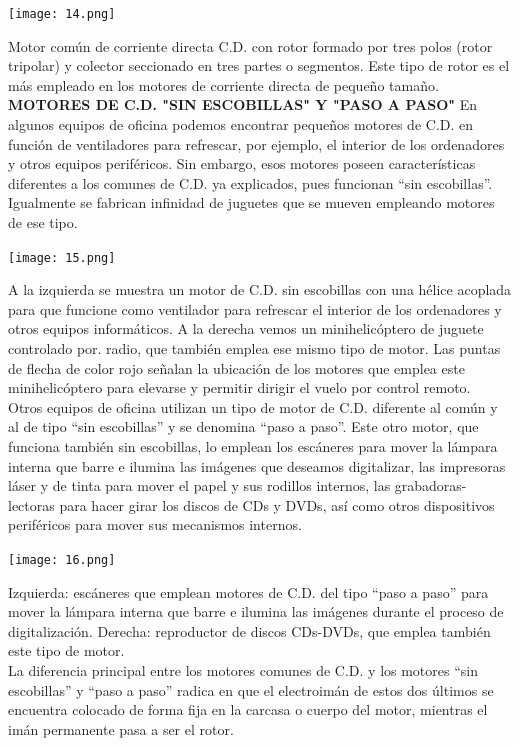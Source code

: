 \documentclass[10pt,a4paper]{article}
\begin{document}
\begin{center}
\texttt{[image: 14.png]} 
\end{center}
Motor común de corriente directa C.D. con rotor formado por tres polos (rotor tripolar) y colector seccionado en tres partes o segmentos. Este tipo de rotor es el más empleado en los motores de corriente directa de pequeño tamaño.\\
\textbf{MOTORES DE C.D. "SIN ESCOBILLAS" Y "PASO A PASO"}
En algunos equipos de oficina podemos encontrar pequeños motores de C.D. en función de ventiladores para refrescar, por ejemplo, el interior de los ordenadores y otros equipos periféricos. Sin embargo, esos motores poseen características diferentes a los comunes de C.D. ya explicados, pues funcionan “sin escobillas”. Igualmente se fabrican infinidad de juguetes que se mueven empleando motores de ese tipo.\\

\begin{center}
\texttt{[image: 15.png]} 
\end{center}

A la izquierda se muestra un motor de C.D. sin escobillas con una hélice acoplada para que funcione como ventilador para refrescar el interior de los ordenadores y otros equipos informáticos. A la derecha vemos un minihelicóptero de juguete controlado por. radio, que también emplea ese mismo tipo de motor. Las puntas de flecha de color rojo señalan la ubicación de los motores que emplea este minihelicóptero para elevarse y permitir dirigir el vuelo por control remoto.\\
Otros equipos de oficina utilizan un tipo de motor de C.D. diferente al común y al de tipo “sin escobillas” y se denomina “paso a paso”. Este otro motor, que funciona también sin escobillas, lo emplean los escáneres para mover la lámpara interna que barre e ilumina las imágenes que deseamos digitalizar, las impresoras láser y de tinta para mover el papel y sus rodillos internos, las grabadoras-lectoras para hacer girar los discos de CDs y DVDs, así como otros dispositivos periféricos para mover sus mecanismos internos.\\

\begin{center}
\texttt{[image: 16.png]} 
\end{center}
Izquierda: escáneres que emplean motores de C.D. del tipo “paso a paso” para mover la lámpara interna que barre e ilumina las imágenes durante el proceso de digitalización. Derecha: reproductor de discos CDs-DVDs, que emplea también este tipo de motor. \\
La diferencia principal entre los motores comunes de C.D. y los motores “sin escobillas” y “paso a paso” radica en que el electroimán de estos dos últimos se encuentra colocado de forma fija en la carcasa o cuerpo del motor, mientras el imán permanente pasa a ser el rotor.\\



{}

\end{document}
